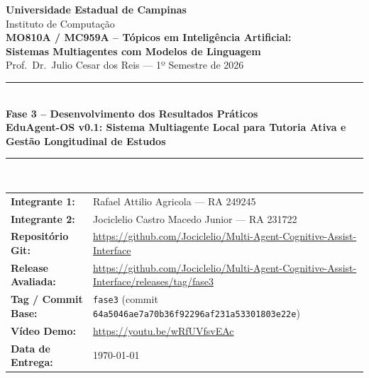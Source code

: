 \documentclass[12pt,a4paper]{article}
\newcommand{\code}[1]{\nolinkurl{#1}}
\begin{document}
\thispagestyle{empty}
\vspace*{1.0cm}
\begin{center}
  {\LARGE \textbf{Universidade Estadual de Campinas}}\\[0.2cm]
  {\large Instituto de Computação}\\[0.5cm]
  {\large \textbf{MO810A / MC959A -- Tópicos em Inteligência Artificial:}}\\[0.1cm]
  {\large \textbf{Sistemas Multiagentes com Modelos de Linguagem}}\\[0.2cm]
  {\normalsize Prof.\ Dr.\ Julio Cesar dos Reis --- 1º Semestre de 2026}\\[0.6cm]
  \rule{\textwidth}{0.4pt}\\[0.4cm]
  {\Large \textbf{Fase 3 -- Desenvolvimento dos Resultados Práticos}}\\[0.3cm]
  {\large \textbf{EduAgent-OS v0.1: Sistema Multiagente Local para Tutoria Ativa e Gestão Longitudinal de Estudos}}\\[0.3cm]
  \rule{\textwidth}{0.4pt}\\[0.6cm]
\end{center}

\noindent
\begin{tabular}{@{}L{4.2cm}L{11.3cm}@{}}
  \textbf{Integrante 1:} & Rafael Attilio Agricola --- RA 249245 \\
  \textbf{Integrante 2:} & Jociclelio Castro Macedo Junior --- RA 231722 \\
  \textbf{Repositório Git:} & \url{https://github.com/Jociclelio/Multi-Agent-Cognitive-Assist-Interface} \\
  \textbf{Release Avaliada:} & \url{https://github.com/Jociclelio/Multi-Agent-Cognitive-Assist-Interface/releases/tag/fase3} \\
  \textbf{Tag / Commit Base:} & \code{fase3} (commit \code{64a5046ae7a70b36f92296af231a53301803e22e}) \\
  \textbf{Vídeo Demo:} & \url{https://youtu.be/wRfUVfsvEAc} \\
  \textbf{Data de Entrega:} & \today \\
\end{tabular}

\newpage
\setcounter{page}{1}

\end{document}
